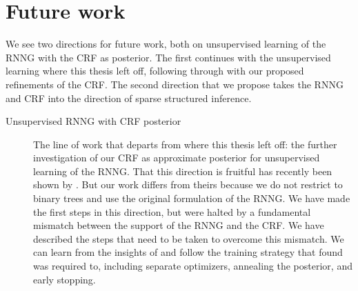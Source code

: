 \section{Future work}
  We see two directions for future work, both on unsupervised learning of the RNNG with the CRF as posterior. The first continues with the unsupervised learning where this thesis left off, following through with our proposed refinements of the CRF. The second direction that we propose takes the RNNG and CRF into the direction of sparse structured inference.

  \begin{description}

    \item[Unsupervised RNNG with CRF posterior]
      The line of work that departs from where this thesis left off: the further investigation of our CRF as approximate posterior for unsupervised learning of the RNNG. That this direction is fruitful has recently been shown by \citet{kim2019unsupervised}. But our work differs from theirs because we do not restrict to binary trees and use the original formulation of the RNNG. We have made the first steps in this direction, but were halted by a fundamental mismatch between the support of the RNNG and the CRF. We have described the steps that need to be taken to overcome this mismatch. We can learn from the insights of \cite{kim2019unsupervised} and follow the training strategy that found was required to, including separate optimizers, annealing the posterior, and early stopping.


\end{description}
